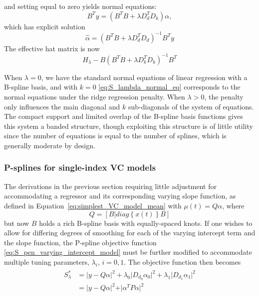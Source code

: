 \documentclass[12pt]{article}
\begin{document}
and setting equal to zero yields normal equations:
\begin{equation}\label{eq:S_lambda_normal_eq}
B^T y = \left(B^T B +  \lambda D_d^TD_k\right)\alpha,
\end{equation}
which has explicit solution
\[
\hat{\alpha} = \left(B^T B +  \lambda D_d^TD_d\right)^{-1}B^T y
\]
\noindent
The effective hat matrix is now
\[
H_\lambda - B\left(B^T B +  \lambda D_k^TD_k\right)^{-1}B^T 
\]

When $\lambda = 0$, we have the standard normal equations of linear regression with a B-spline basis, and with $k = 0$ \ref{eq:S_lambda_normal_eq} corresponds to the normal equations under the ridge regression penalty. When $\lambda > 0$, the penalty only influences the main diagonal and $k$ sub-diagonals of the system of equations. The compact support and limited overlap of the B-spline basis functions gives this system a banded structure, though exploiting this structure is of little utility since the number of equations is equal to the number of splines, which is generally moderate by design. 



\subsubsection{P-splines for single-index VC models}

The derivations in the previous section requiring little adjustment for accommodating a regressor and its corresponding varying slope function, as defined in Equation~\ref{eq:simplest_VC_model_mean} with $\mu\left(t\right) =  Q\alpha$, where 
\[
Q = \left[B | diag\left\{x\left(t\right) \right\}B \right]
\]
but now $B$ holds a rich B-spline basis with equally-spaced knots. If one wishes to allow for differing degrees of smoothing for each of the varying intercept term and the slope function, the P-spline objective function \ref{eq:S_pen_varying_intercept_model} must be further modified to accommodate multiple tuning parameters, $\lambda_i$, $i=0,1$. The objective function then becomes
\begin{align} 
\begin{split}
S^*_\lambda &= \vert y- Q\alpha  \vert^2  + \lambda_0 \vert D_{d_0} \alpha_0 \vert^2 + \lambda_1 \vert D_{d_1} \alpha_1 \vert^2\\
	&= \vert y- Q\alpha  \vert^2  + \vert \alpha^T P \alpha \vert^2
\end{split} \label{eq:S_pen_star}
\end{align}
\end{document}
